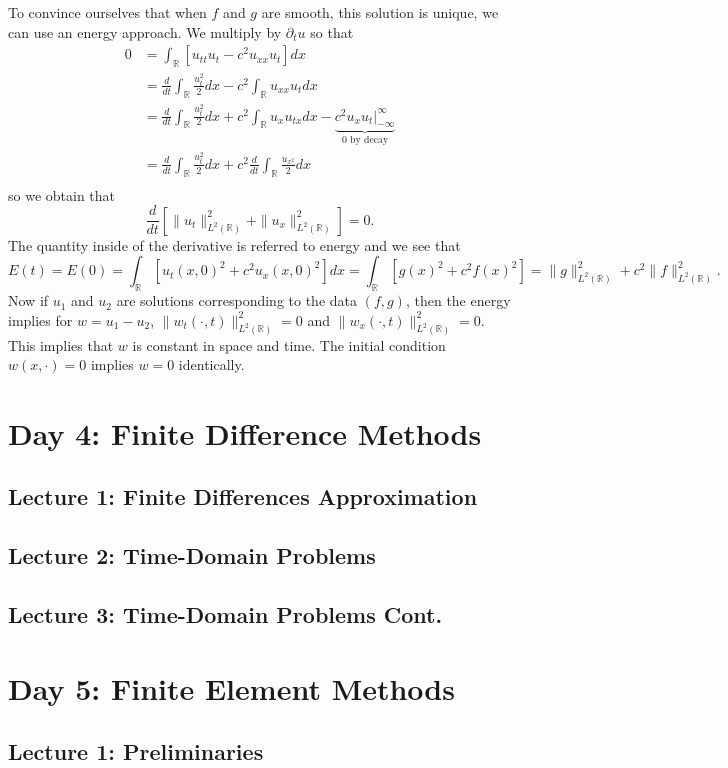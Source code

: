 \documentclass{article}
\theoremstyle{definition}
\theoremstyle{definition}
\newcommand{\R}{\mathbb{R}}
\begin{document}
To convince ourselves that when $f$ and $g$ are smooth, this solution is unique, we can use an energy approach. We multiply by $\partial_{t}u$ so that
\begin{align*}
    0&=\int_{\R}[u_{tt}u_{t}-c^2u_{xx}u_{t}]dx\\
    &=\frac{d}{dt}\int_{\R}\frac{u_{t}^2}{2}dx-c^2\int_{\R}u_{xx}u_{t}dx \\
    &=\frac{d}{dt}\int_{\R}\frac{u_{t}^2}{2}dx+c^2\int_{\R}u_{x}u_{tx}dx-\underbrace{c^2u_{x}u_{t}\Bigg|_{-\infty}^{\infty}}_{0\text{ by decay}} \\
    &=\frac{d}{dt}\int_{\R}\frac{u_{t}^2}{2}dx+c^2\frac{d}{dt}\int_{\R}\frac{u_{x^2}}{2}dx \\
\end{align*}
so we obtain that
$$\frac{d}{dt}[\|u_t\|^2_{L^2(\R)}+\|u_{x}\|^2_{L^2(\R)}]=0.$$
The quantity inside of the derivative is referred to energy and we see that
$$E(t)=E(0)=\int_{\R}[u_t(x,0)^2+c^2u_x(x,0)^2]dx=\int_{\R}[g(x)^2+c^2f(x)^2]=\|g\|^2_{L^2(\R)}+c^2\|f\|^2_{L^2(\R)}.$$
Now if $u_1$ and $u_2$ are solutions corresponding to the data $(f,g)$, then the energy implies for $w=u_1-u_2$, $\|w_{t}(\cdot,t)\|^2_{L^2(\R)}=0$ and $\|w_{x}(\cdot,t)\|^2_{L^2(\R)}=0$. This implies that $w$ is constant in space and time. The initial condition $w(x,\cdot)=0$ implies $w=0$ identically.

\section{Day 4: Finite Difference Methods}
\subsection{Lecture 1: Finite Differences Approximation}
\subsection{Lecture 2: Time-Domain Problems}
\subsection{Lecture 3: Time-Domain Problems Cont.}

\section{Day 5: Finite Element Methods}
\subsection{Lecture 1: Preliminaries}
\end{document}
